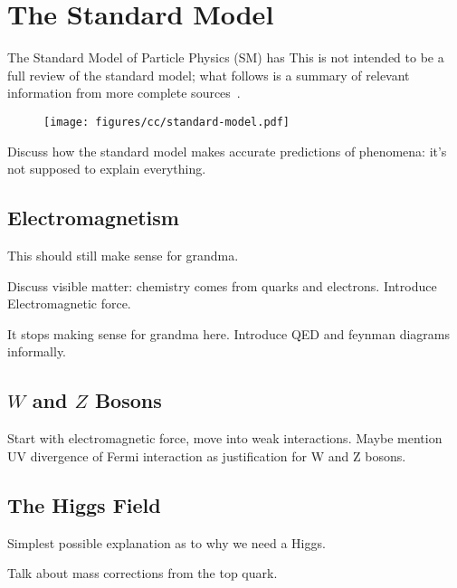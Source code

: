 \section{The Standard Model}
The Standard Model of Particle Physics (SM) has
This is not intended to be a full review of the standard model; what follows is a summary of relevant information from more complete sources~\cite{peskin}.
\begin{figure}
  \texttt{[image: figures/cc/standard-model.pdf]}
\end{figure}

Discuss how the standard model makes accurate predictions of phenomena: it's not supposed to explain everything.
\subsection{Electromagnetism}

This should still make sense for grandma.

Discuss visible matter: chemistry comes from quarks and electrons. Introduce Electromagnetic force.

It stops making sense for grandma here. Introduce QED and feynman diagrams informally.

\subsection{$W$ and $Z$ Bosons}
Start with electromagnetic force, move into weak interactions. Maybe mention UV divergence of Fermi interaction as justification for W and Z bosons.
\subsection{The Higgs Field}
Simplest possible explanation as to why we need a Higgs.

Talk about mass corrections from the top quark.
